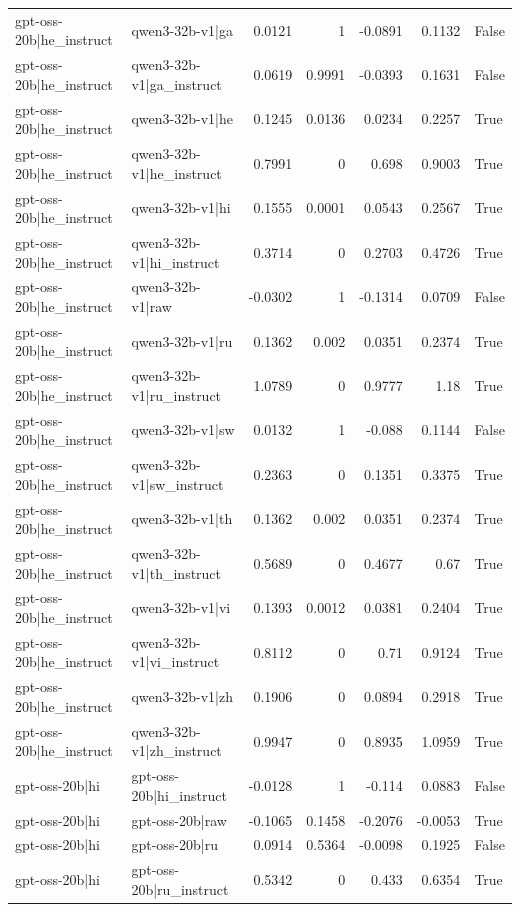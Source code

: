 \begin{table}
\begin{tabular}{l l r r r r l}
gpt-oss-20b|he_instruct & qwen3-32b-v1|ga & 0.0121 & 1 & -0.0891 & 0.1132 & False \\
gpt-oss-20b|he_instruct & qwen3-32b-v1|ga_instruct & 0.0619 & 0.9991 & -0.0393 & 0.1631 & False \\
gpt-oss-20b|he_instruct & qwen3-32b-v1|he & 0.1245 & 0.0136 & 0.0234 & 0.2257 & True \\
gpt-oss-20b|he_instruct & qwen3-32b-v1|he_instruct & 0.7991 & 0 & 0.698 & 0.9003 & True \\
gpt-oss-20b|he_instruct & qwen3-32b-v1|hi & 0.1555 & 0.0001 & 0.0543 & 0.2567 & True \\
gpt-oss-20b|he_instruct & qwen3-32b-v1|hi_instruct & 0.3714 & 0 & 0.2703 & 0.4726 & True \\
gpt-oss-20b|he_instruct & qwen3-32b-v1|raw & -0.0302 & 1 & -0.1314 & 0.0709 & False \\
gpt-oss-20b|he_instruct & qwen3-32b-v1|ru & 0.1362 & 0.002 & 0.0351 & 0.2374 & True \\
gpt-oss-20b|he_instruct & qwen3-32b-v1|ru_instruct & 1.0789 & 0 & 0.9777 & 1.18 & True \\
gpt-oss-20b|he_instruct & qwen3-32b-v1|sw & 0.0132 & 1 & -0.088 & 0.1144 & False \\
gpt-oss-20b|he_instruct & qwen3-32b-v1|sw_instruct & 0.2363 & 0 & 0.1351 & 0.3375 & True \\
gpt-oss-20b|he_instruct & qwen3-32b-v1|th & 0.1362 & 0.002 & 0.0351 & 0.2374 & True \\
gpt-oss-20b|he_instruct & qwen3-32b-v1|th_instruct & 0.5689 & 0 & 0.4677 & 0.67 & True \\
gpt-oss-20b|he_instruct & qwen3-32b-v1|vi & 0.1393 & 0.0012 & 0.0381 & 0.2404 & True \\
gpt-oss-20b|he_instruct & qwen3-32b-v1|vi_instruct & 0.8112 & 0 & 0.71 & 0.9124 & True \\
gpt-oss-20b|he_instruct & qwen3-32b-v1|zh & 0.1906 & 0 & 0.0894 & 0.2918 & True \\
gpt-oss-20b|he_instruct & qwen3-32b-v1|zh_instruct & 0.9947 & 0 & 0.8935 & 1.0959 & True \\
gpt-oss-20b|hi & gpt-oss-20b|hi_instruct & -0.0128 & 1 & -0.114 & 0.0883 & False \\
gpt-oss-20b|hi & gpt-oss-20b|raw & -0.1065 & 0.1458 & -0.2076 & -0.0053 & True \\
gpt-oss-20b|hi & gpt-oss-20b|ru & 0.0914 & 0.5364 & -0.0098 & 0.1925 & False \\
gpt-oss-20b|hi & gpt-oss-20b|ru_instruct & 0.5342 & 0 & 0.433 & 0.6354 & True \\

\end{tabular}
\end{table}
